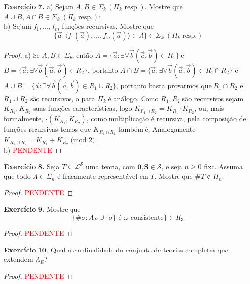 \documentclass[11pt]{article}
\newcommand{\mc}[1]{\mathcal{#1}}
\begin{document}
\begin{shaded}
\textbf{Exercício 7.} a) Sejam $A,B\in\Sigma_k~(\Pi_k\text{ resp.})$. Mostre que $A\cup B,A\cap B\in\Sigma_k~(\Pi_k\text{ resp.})$;\\
b) Sejam $f_1,\dots,f_m$ funções recursivas. Mostre que
$$\{\vec{a}:\langle f_1(\vec{a}),\dots,f_m(\vec{a})\rangle\in A\}\in\Sigma_k~(\Pi_k\text{ resp.})$$
\end{shaded}

\begin{proof}
    a) Se $A,B\in\Sigma_k$, então $A=\{\vec{a}:\exists\forall\vec{b}(\vec{a},\vec{b})\in R_1\}$ e $B=\{\vec{a}:\exists\forall\vec{b}(\vec{a},\vec{b})\in R_2\}$, portanto $A\cap B=\{\vec{a}:\exists\forall\vec{b}(\vec{a},\vec{b})\in R_1\cap R_2\}$ e $A\cup B=\{\vec{a}:\exists\forall\vec{b}(\vec{a},\vec{b})\in R_1\cup R_2\}$, portanto basta provarmos que $R_1\cap R_2$ e $R_1\cup R_2$ são recursivos, o para $\Pi_k$ é análogo. Como $R_1,R_2$ são recursivos sejam $K_{R_1},K_{R_2}$ suas funções características, logo $K_{R_1\cap R_2}=K_{R_1}\cdot K_{R_2}$, ou, mais formalmente, $\cdot(K_{R_1},K_{R_2})$, como multiplicação é recursiva, pela composição de funções recursivas temos que $K_{R_1\cap R_2}$ também é. Analogamente $K_{R_1\cup R_2}=K_{R_1}+K_{R_2}\text{ (mod 2)}$.\\
    b) \textcolor{red}{PENDENTE}
\end{proof}

\begin{shaded}
\textbf{Exercício 8.} Seja $T\subseteq\mc{L}^\mc{S}$ uma teoria, com $\mathbf{0,S}\in\mc{S}$, e seja $n\geq0$ fixo. Assuma que todo $A\in\Sigma_n$ é fracamente representável em $T$. Mostre que $\#T\notin\Pi_n$.
\end{shaded}

\begin{proof}
    \textcolor{red}{PENDENTE}
\end{proof}

\begin{shaded}
\textbf{Exercício 9.} Mostre que
$$\{\#\sigma:A_E\cup\{\sigma\}\text{ é }\omega\text{-consistente}\}\in\Pi_3$$
\end{shaded}

\begin{proof}
    \textcolor{red}{PENDENTE}
\end{proof}

\begin{shaded}
\textbf{Exercício 10.} Qual a cardinalidade do conjunto de teorias completas que extendem $A_E$?
\end{shaded}

\begin{proof}
    \textcolor{red}{PENDENTE}
\end{proof}
\end{document}
